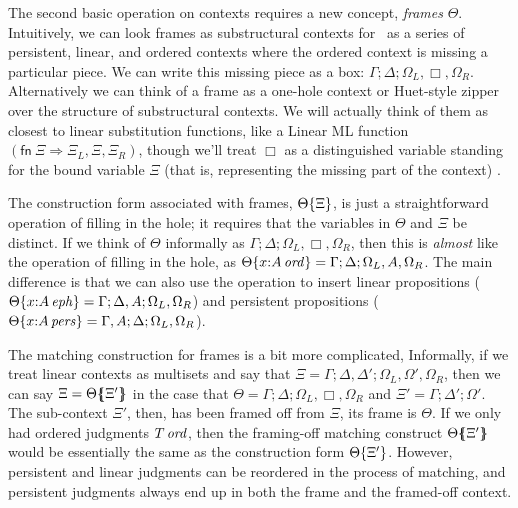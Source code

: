 The second basic operation on contexts requires a new concept, {\it
  frames} $\Theta$. Intuitively, we can look frames as substructural
contexts for \ollll~as a series of persistent, linear, and ordered
contexts where the ordered context is missing a particular piece. We
can write this missing piece as a box: $\Gamma; \Delta; \Omega_L,
\Box, \Omega_R$. Alternatively we can think of a frame as a one-hole
context or Huet-style zipper \cite{huet97zipper} over the structure
of substructural contexts. We will actually think of them
as closest to linear substitution functions, like a Linear ML function
$(\mathsf{fn}~\Xi\Rightarrow \Xi_L, \Xi, \Xi_R)$, though we'll 
treat $\Box$ as a distinguished variable standing for the bound variable 
$\Xi$ (that is, representing the missing part of the context)
\cite{simmons09linear}.

The construction form associated with frames, ${\Theta}\{{\Xi}\}$,
is just a straightforward operation of filling in the hole; it
requires that the variables in $\Theta$ and $\Xi$ be distinct. If we
think of $\Theta$ informally as $\Gamma; \Delta; \Omega_L, \Box,
\Omega_R$, then this is {\it almost} like the operation of filling in
the hole, as ${\Theta}\{{x{:}{A}\,{{\it ord}}}\} = \Gamma; \Delta;
\Omega_L, A, \Omega_R$. The main difference is that we can also use
the operation to insert linear propositions
(${\Theta}\{{x{:}{A}\,{{\it eph}}}\} = \Gamma; \Delta, A; \Omega_L,
\Omega_R$) and persistent propositions
(${\Theta}\{{x{:}{A}\,{{\it pers}}}\} = \Gamma, A; \Delta; \Omega_L,
\Omega_R$).

The matching construction for frames is a bit more complicated,
Informally, if we treat linear contexts as multisets and say that $\Xi
= \Gamma; \Delta, \Delta'; \Omega_L, \Omega', \Omega_R$, then we can
say $\Xi = {\Theta}\mbox{$\{\hspace{-4pt}\{$}{\Xi'}\mbox{$\}\hspace{-4pt}\}$}$ in the case that $\Theta = \Gamma;
\Delta; \Omega_L, \Box, \Omega_R$ and $\Xi' = \Gamma; \Delta';
\Omega'$. The sub-context $\Xi'$, then, has been framed off from
$\Xi$, its frame is $\Theta$. If we only had ordered judgments
${T}\,{{\it ord}}$, then the framing-off matching construct
${\Theta}\mbox{$\{\hspace{-4pt}\{$}{\Xi'}\mbox{$\}\hspace{-4pt}\}$}$ would be essentially the same as the
construction form ${\Theta}\{{\Xi'}\}$. However, persistent and
linear judgments can be reordered in the process of matching, and
persistent judgments always end up in both the frame and the 
framed-off context. 

